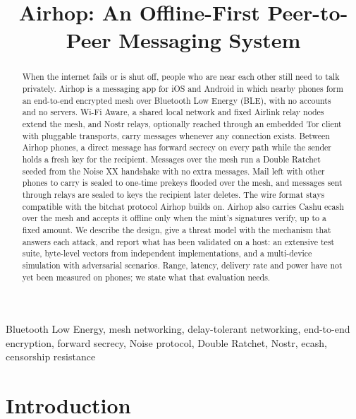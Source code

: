 \documentclass[conference]{IEEEtran}
\begin{document}
\title{Airhop: An Offline-First Peer-to-Peer Messaging System}

\author{
}

\maketitle

\begin{abstract}
When the internet fails or is shut off, people who are near each other still need to talk privately. Airhop is a messaging app for iOS and Android in which nearby phones form an end-to-end encrypted mesh over Bluetooth Low Energy (BLE), with no accounts and no servers. Wi-Fi Aware, a shared local network and fixed Airlink relay nodes extend the mesh, and Nostr relays, optionally reached through an embedded Tor client with pluggable transports, carry messages whenever any connection exists. Between Airhop phones, a direct message has forward secrecy on every path while the sender holds a fresh key for the recipient. Messages over the mesh run a Double Ratchet seeded from the Noise XX handshake with no extra messages. Mail left with other phones to carry is sealed to one-time prekeys flooded over the mesh, and messages sent through relays are sealed to keys the recipient later deletes. The wire format stays compatible with the bitchat protocol Airhop builds on. Airhop also carries Cashu ecash over the mesh and accepts it offline only when the mint's signatures verify, up to a fixed amount. We describe the design, give a threat model with the mechanism that answers each attack, and report what has been validated on a host: an extensive test suite, byte-level vectors from independent implementations, and a multi-device simulation with adversarial scenarios. Range, latency, delivery rate and power have not yet been measured on phones; we state what that evaluation needs.
\end{abstract}

\begin{IEEEkeywords}
Bluetooth Low Energy, mesh networking, delay-tolerant networking, end-to-end encryption, forward secrecy, Noise protocol, Double Ratchet, Nostr, ecash, censorship resistance
\end{IEEEkeywords}

\section{Introduction}
\label{sec:intro}
\end{document}
